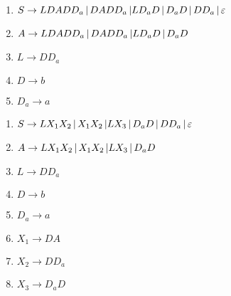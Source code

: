 \begin{tcolorbox}[colback=yellow!15!white, colframe=blue!50!white,
	fonttitle=\bfseries\Large, title = Μετατροπή $CFG\rightarrow CNF$ 2/3]
\begin{itemize}
		\begin{minipage}[t]{0.5\textwidth}
			\begin{enumerate}
				\item $S\rightarrow LDADD_a \,|\, DADD_a \,|\\
				LD_aD \,|\, D_aD \,|\, DD_a \,|\, \varepsilon$
				\reducevspace
				\item $A\rightarrow LDADD_a \,|\, DADD_a \,|\\
				LD_aD \,|\, D_aD$
				\reducevspace
				\item $L\rightarrow DD_a$
				\reducevspace
				\item $D\rightarrow b$
				\reducevspace
				\item $D_a\rightarrow a$
			\end{enumerate}
		\end{minipage}%
		\hfill
		\begin{minipage}[t]{0.5\textwidth}
			\begin{enumerate}
				\item $S\rightarrow LX_1X_2 \,|\, X_1X_2 \,|\\
				LX_3 \,|\, D_aD \,|\, DD_a \,|\, \varepsilon$
				\reducevspace
				\item $A\rightarrow LX_1X_2 \,|\, X_1X_2 \,|\\
				LX_3 \,|\, D_aD$
				\reducevspace
				\item $L\rightarrow DD_a$
				\reducevspace
				\item $D\rightarrow b$
				\reducevspace
				\item $D_a\rightarrow a$
				\reducevspace
				\item $X_1\rightarrow DA$
				\reducevspace
				\item $X_2\rightarrow DD_a$
				\reducevspace
				\item $X_3\rightarrow D_aD$
			\end{enumerate}
		\end{minipage}

	\end{itemize}

\end{tcolorbox}

